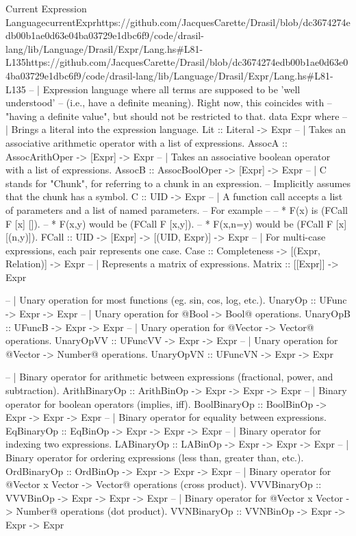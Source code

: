 \begin{haskell}{Current Expression Language}{currentExpr}{https://github.com/JacquesCarette/Drasil/blob/dc3674274edb00b1ae0d63e04ba03729e1dbc\linebreak{}6f9/code/drasil-lang/lib/Language/Drasil/Expr/Lang.hs\#L81-L135}{https://github.com/JacquesCarette/Drasil/blob/dc3674274edb00b1ae0d63e04ba03729e1dbc6f9/code/drasil-lang/lib/Language/Drasil/Expr/Lang.hs\#L81-L135}
    -- | Expression language where all terms are supposed to be 'well understood'
    --   (i.e., have a definite meaning). Right now, this coincides with
    --   "having a definite value", but should not be restricted to that.
    data Expr where
    -- | Brings a literal into the expression language.
    Lit :: Literal -> Expr
    -- | Takes an associative arithmetic operator with a list of expressions.
    AssocA   :: AssocArithOper -> [Expr] -> Expr
    -- | Takes an associative boolean operator with a list of expressions.
    AssocB   :: AssocBoolOper  -> [Expr] -> Expr
    -- | C stands for "Chunk", for referring to a chunk in an expression.
    --   Implicitly assumes that the chunk has a symbol.
    C        :: UID -> Expr
    -- | A function call accepts a list of parameters and a list of named parameters.
    --   For example
    --
    --   * F(x) is (FCall F [x] []).
    --   * F(x,y) would be (FCall F [x,y]).
    --   * F(x,n=y) would be (FCall F [x] [(n,y)]).
    FCall    :: UID -> [Expr] -> [(UID, Expr)] -> Expr
    -- | For multi-case expressions, each pair represents one case.
    Case     :: Completeness -> [(Expr, Relation)] -> Expr
    -- | Represents a matrix of expressions.
    Matrix   :: [[Expr]] -> Expr

    -- | Unary operation for most functions (eg. sin, cos, log, etc.).
    UnaryOp       :: UFunc -> Expr -> Expr
    -- | Unary operation for @Bool -> Bool@ operations.
    UnaryOpB      :: UFuncB -> Expr -> Expr
    -- | Unary operation for @Vector -> Vector@ operations.
    UnaryOpVV     :: UFuncVV -> Expr -> Expr
    -- | Unary operation for @Vector -> Number@ operations.
    UnaryOpVN     :: UFuncVN -> Expr -> Expr

    -- | Binary operator for arithmetic between expressions (fractional, power, and subtraction).
    ArithBinaryOp :: ArithBinOp -> Expr -> Expr -> Expr
    -- | Binary operator for boolean operators (implies, iff).
    BoolBinaryOp  :: BoolBinOp -> Expr -> Expr -> Expr
    -- | Binary operator for equality between expressions.
    EqBinaryOp    :: EqBinOp -> Expr -> Expr -> Expr
    -- | Binary operator for indexing two expressions.
    LABinaryOp    :: LABinOp -> Expr -> Expr -> Expr
    -- | Binary operator for ordering expressions (less than, greater than, etc.).
    OrdBinaryOp   :: OrdBinOp -> Expr -> Expr -> Expr
    -- | Binary operator for @Vector x Vector -> Vector@ operations (cross product).
    VVVBinaryOp   :: VVVBinOp -> Expr -> Expr -> Expr
    -- | Binary operator for @Vector x Vector -> Number@ operations (dot product).
    VVNBinaryOp   :: VVNBinOp -> Expr -> Expr -> Expr


\end{haskell}
